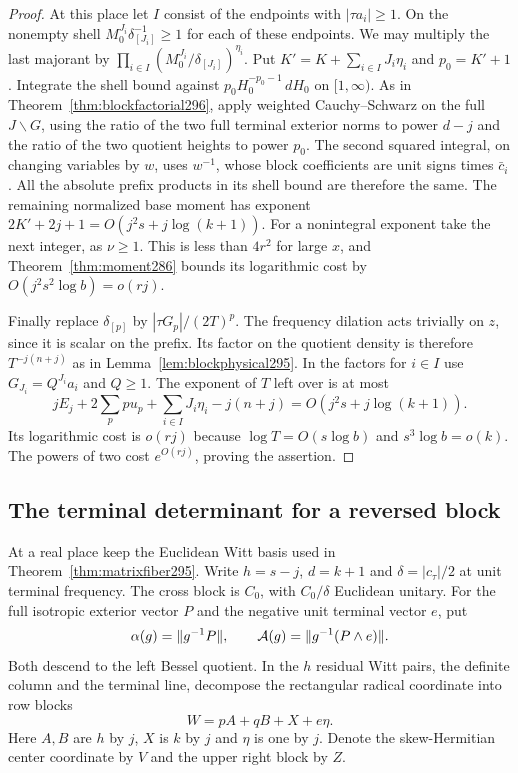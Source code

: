 \documentclass[a4paper,11pt]{article}
\theoremstyle{definition}
\theoremstyle{remark}
\numberwithin{equation}{section}
\begin{document}
\begin{proof}
At this place let \(I\) consist of the endpoints with
\(|\tau a_i|\ge1\). On the nonempty shell
\(M_0^{J_i}\delta_{[J_i]}^{-1}\ge1\) for each of these
endpoints. We may multiply the last majorant by
\(\prod_{i\in I}(M_0^{J_i}/\delta_{[J_i]})^{\eta_i}\).
Put \(K'=K+\sum_{i\in I}J_i\eta_i\) and \(p_0=K'+1\).
Integrate the shell bound against \(p_0H_0^{-p_0-1}\,dH_0\)
on \([1,\infty)\). As in Theorem~\ref{thm:blockfactorial296},
apply weighted Cauchy--Schwarz on the full \(J\backslash G\),
using the ratio of the two full terminal exterior norms to
power \(d-j\) and the ratio of the two quotient heights to
power \(p_0\). The second squared integral, on changing
variables by \(w\), uses \(w^{-1}\), whose block coefficients
are unit signs times \(\bar c_i\). All the absolute prefix
products in its shell bound are therefore the same.
The remaining normalized base moment has exponent
\(2K'+2j+1=O(j^2s+j\log(k+1))\). For a nonintegral
exponent take the next integer, as \(\nu\ge1\).
This is less than \(4r^2\) for large \(x\), and
Theorem~\ref{thm:moment286} bounds its logarithmic cost
by \(O(j^2s^2\log b)=o(rj)\).

Finally replace \(\delta_{[p]}\) by
\(|\tau G_p|/(2T)^p\). The frequency dilation acts trivially
on \(z\), since it is scalar on the prefix. Its factor on
the quotient density is therefore \(T^{-j(n+j)}\) as
in Lemma~\ref{lem:blockphysical295}. In the factors for
\(i\in I\) use \(G_{J_i}=Q^{J_i}a_i\) and \(Q\ge1\).
The exponent of \(T\) left over is at most
\[
 jE_j+2\sum_p p u_p+\sum_{i\in I}J_i\eta_i-j(n+j)
                           = O(j^2s+j\log(k+1)).
\]
Its logarithmic cost is \(o(rj)\) because
\(\log T=O(s\log b)\) and \(s^3\log b=o(k)\).
The powers of two cost \(e^{O(rj)}\), proving the assertion.
\end{proof}

\subsection{The terminal determinant for a reversed block}\label{nav:VIII-55}
At a real place keep the Euclidean Witt basis used in
Theorem~\ref{thm:matrixfiber295}. Write \(h=s-j\), \(d=k+1\) and
\(\delta=|c_\tau|/2\) at unit terminal frequency. The cross block
is \(C_0\), with \(C_0/\delta\) Euclidean unitary. For the full
isotropic exterior vector \(P\) and the negative unit terminal
vector \(e\), put
\[
  \alpha(g)=\|g^{-1}P\|,\qquad
  {\cal A}(g)=\|g^{-1}(P\wedge e)\|.
\]
Both descend to the left Bessel quotient. In the \(h\) residual
Witt pairs, the definite column and the terminal line, decompose
the rectangular radical coordinate into row blocks
\[
             W=pA+qB+X+e\eta .
\]
Here \(A,B\) are \(h\) by \(j\), \(X\) is \(k\) by \(j\)
and \(\eta\) is one by \(j\). Denote the skew-Hermitian center
coordinate by \(V\) and the upper right block by \(Z\).
\end{document}
